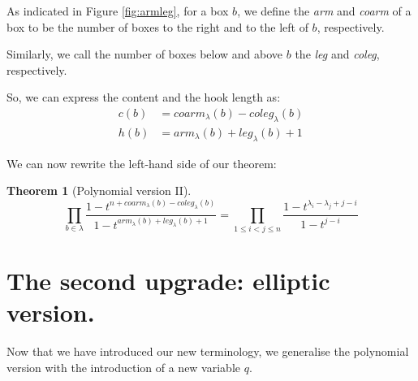 \documentclass[a4paper,11pt]{amsart}
\newenvironment{Figure}
  {\par\medskip\noindent\minipage{\linewidth}}
  {\endminipage\par\medskip}
\newtheorem*{theorem*}{Theorem}
\begin{document}
\begin{multicols}{2}
    \begin{Figure}
        \centering
        \label{fig:armleg}
    \end{Figure}
			
			
		\columnbreak
			
			As indicated in Figure \ref{fig:armleg}, for a box $b$, we define the \textit{arm} and \textit{coarm} of a box to be the number of boxes to the right and to the left of $b$, respectively. 
			
			Similarly, we call the number of boxes below and above $b$ the \textit{leg} and \textit{coleg}, respectively.
			
			So, we can express the content and the hook length as: 
			\begin{align*}
				c(b) &= coarm_\lambda(b) - coleg_\lambda(b)\\
				h(b) &= arm_\lambda(b)+leg_\lambda(b)+1
			\end{align*}
\end{multicols}
		
		
		We can now rewrite the left-hand side of our theorem:
		\begin{theorem*}[Polynomial version II]
			\begin{equation*}
				\prod_{b\in \lambda} \dfrac{1-t^{n+coarm_\lambda(b)- coleg_\lambda(b)}}{1-t^{arm_\lambda(b)+leg_\lambda(b)+1}} = \prod_{1\leq i <j \leq n} \dfrac{1-t^{\lambda_i-\lambda_j+j-i}}{1-t^{j-i}} 
			\end{equation*}
		\end{theorem*}
		
		\pagebreak
				\section{The second upgrade: elliptic version.}
		Now that we have introduced our new terminology, we generalise the polynomial version with the introduction of a new variable $q$. %
		
\end{document}
